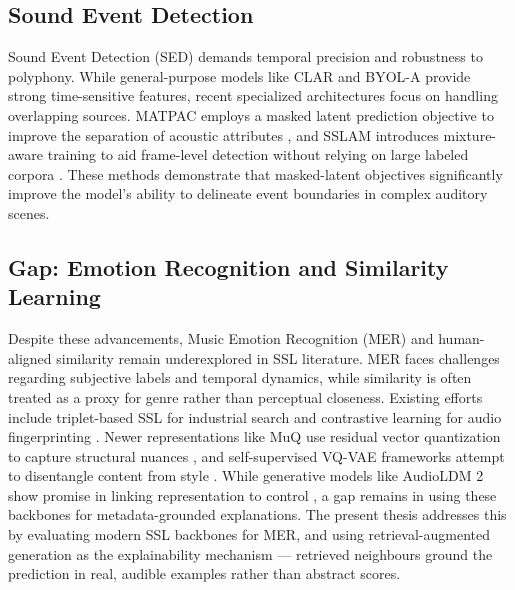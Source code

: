\documentclass[12pt]{report}
\begin{document}
\subsection{Sound Event Detection}
Sound Event Detection (SED) demands temporal precision and robustness to polyphony. While general-purpose models like CLAR \cite{saeed_contrastive_2021} and BYOL-A \cite{niizumi_byol_2023} provide strong time-sensitive features, recent specialized architectures focus on handling overlapping sources. MATPAC employs a masked latent prediction objective to improve the separation of acoustic attributes \cite{quelennec_masked_2025}, and SSLAM introduces mixture-aware training to aid frame-level detection without relying on large labeled corpora \cite{alex_sslam_2025}. These methods demonstrate that masked-latent objectives significantly improve the model's ability to delineate event boundaries in complex auditory scenes.

\subsection{Gap: Emotion Recognition and Similarity Learning}
Despite these advancements, Music Emotion Recognition (MER) and human-aligned similarity remain underexplored in SSL literature. MER faces challenges regarding subjective labels and temporal dynamics, while similarity is often treated as a proxy for genre rather than perceptual closeness. Existing efforts include triplet-based SSL for industrial search \cite{thome_musical_2022} and contrastive learning for audio fingerprinting \cite{chang_neural_2021}. Newer representations like MuQ use residual vector quantization to capture structural nuances \cite{zhu_muq_2025}, and self-supervised VQ-VAE frameworks attempt to disentangle content from style \cite{cifka_self-supervised_2021}. While generative models like AudioLDM 2 show promise in linking representation to control \cite{liu_audioldm_2024}, a gap remains in using these backbones for metadata-grounded explanations. The present thesis addresses this by evaluating modern SSL backbones for MER, and using retrieval-augmented generation as the explainability mechanism --- retrieved neighbours ground the prediction in real, audible examples rather than abstract scores.
\end{document}
